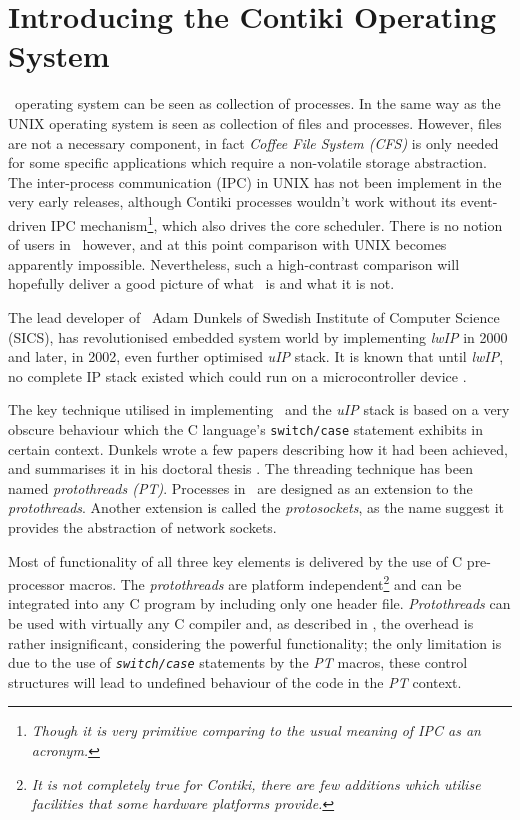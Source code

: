 \section{Introducing the Contiki Operating System}\label{sec:CONTIKI}

  \Contiki\ operating system can be seen as collection of processes.
 In the same way as the UNIX operating system is seen as collection of
 files and processes. However, files are not a necessary component, in
 fact \emph{Coffee File System (CFS)} is only needed for some specific
 applications which require a non-volatile storage abstraction. 
  The inter-process communication (IPC) in UNIX has not been implement
 in the very early releases, although Contiki processes wouldn't work
 without its event-driven IPC mechanism\footnote{\emph{Though it is very
 primitive comparing to the usual meaning of IPC as an acronym.}}, which also
 drives the core scheduler. There is no notion of users in \Contiki\,
 however, and at this point comparison with UNIX becomes apparently
 impossible. Nevertheless, such a high-contrast comparison will hopefully
 deliver a good picture of what \ContikiOS\ is and what it is not.


  The lead developer of \Contiki\, Adam Dunkels of Swedish Institute of
 Computer Science (SICS), has revolutionised embedded system world by
 implementing \emph{lwIP} in 2000 and later, in 2002, even further optimised
 \emph{uIP} stack. It is known that until \emph{lwIP}, no complete IP stack
 existed which could run on a microcontroller device \cite{dunkels03full}.

  The key technique utilised in implementing \Contiki\ and the \emph{uIP}
 stack is based on a very obscure behaviour which the C language's
 \texttt{switch/case} statement exhibits in certain context. Dunkels
 wrote a few papers \cite{dunkels05protothreads,dunkels06protothreads}
 describing how it had been achieved, and summarises it in his doctoral
 thesis \cite{dunkels07programming}. The threading technique has been
 named \emph{protothreads (PT)}. Processes in \Contiki\ are designed as
 an extension to the \emph{protothreads}. Another extension is called
 the \emph{protosockets}, as the name suggest it provides the abstraction
 of network sockets.

  Most of functionality of all three key elements is delivered by the use
 of C pre-processor macros. The \emph{protothreads} are platform
 independent\footnote{\emph{It is not completely true for Contiki, there
 are few additions which utilise facilities that some hardware platforms provide.}}
 and can be integrated into any C program by including only one header file.
 \emph{Protothreads} can be used with virtually any C compiler and,
 as described in \cite{dunkels06protothreads}, the overhead is rather
 insignificant, considering the powerful functionality; the only limitation
 is due to the use of \emph{\texttt{switch/case}} statements by the \emph{PT}
 macros, these control structures will lead to undefined behaviour of the
 code in the \emph{PT} context.

